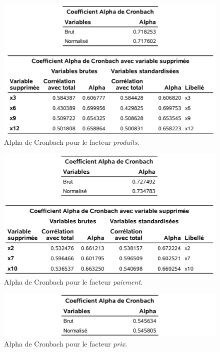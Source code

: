 \documentclass[
  11pt,
  letterpaper,
]{book}
\theoremstyle{definition}
\theoremstyle{definition}
\theoremstyle{definition}
\theoremstyle{remark}
\begin{document}
\begin{figure}

{\centering \includegraphics[width=0.85\linewidth]{figures/01-facto-e9} 

}

\caption{Alpha de Cronbach pour le facteur \emph{produits}.}\label{fig:fig1p9}
\end{figure}

\begin{figure}

{\centering \includegraphics[width=0.85\linewidth]{figures/01-facto-e10} 

}

\caption{Alpha de Cronbach pour le facteur \emph{paiement}.}\label{fig:fig1p10}
\end{figure}

\begin{figure}

{\centering \includegraphics[width=0.85\linewidth]{figures/01-facto-e11} 

}

\caption{Alpha de Cronbach pour le facteur \emph{prix}.}\label{fig:fig1p11}
\end{figure}
\end{document}
